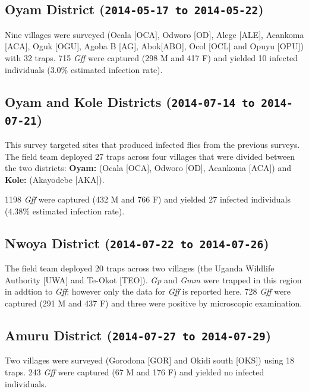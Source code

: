 \documentclass[letterpaper]{report}
\begin{document}
\subsection{Oyam District
(\texttt{2014-05-17 to 2014-05-22})}\label{oyam-district-2014-05-17-to-2014-05-22}

Nine villages were surveyed (Ocala {[}OCA{]}, Odworo {[}OD{]}, Alege
{[}ALE{]}, Acankoma {[}ACA{]}, Oguk {[}OGU{]}, Agoba B {[}AG{]},
Abok{[}ABO{]}, Ocol {[}OCL{]} and Opuyu {[}OPU{]}) with 32 traps. 715
\emph{Gff} were captured (298 M and 417 F) and yielded 10 infected
individuals (3.0\% estimated infection rate).

\subsection{Oyam and Kole Districts
(\texttt{2014-07-14 to 2014-07-21})}\label{oyam-and-kole-districts-2014-07-14-to-2014-07-21}

This survey targeted sites that produced infected flies from the
previous surveys. The field team deployed 27 traps across four villages
that were divided between the two districts: \textbf{Oyam:} (Ocala
{[}OCA{]}, Odworo {[}OD{]}, Acankoma {[}ACA{]}) and \textbf{Kole:}
(Akayodebe {[}AKA{]}).

1198 \emph{Gff} were captured (432 M and 766 F) and yielded 27 infected
individuals (4.38\% estimated infection rate).

\subsection{Nwoya District
(\texttt{2014-07-22 to 2014-07-26})}\label{nwoya-district-2014-07-22-to-2014-07-26}

The field team deployed 20 traps across two villages (the Uganda
Wildlife Authority {[}UWA{]} and Te-Okot {[}TEO{]}). \emph{Gp} and
\emph{Gmm} were trapped in this region in addtion to \emph{Gff}; however
only the data for \emph{Gff} is reported here. 728 \emph{Gff} were
captured (291 M and 437 F) and three were positive by microscopic
examination.

\subsection{Amuru District
(\texttt{2014-07-27 to 2014-07-29})}\label{amuru-district-2014-07-27-to-2014-07-29}

Two villages were surveyed (Gorodona {[}GOR{]} and Okidi south
{[}OKS{]}) using 18 traps. 243 \emph{Gff} were captured (67 M and 176 F)
and yielded no infected individuals.
\end{document}
